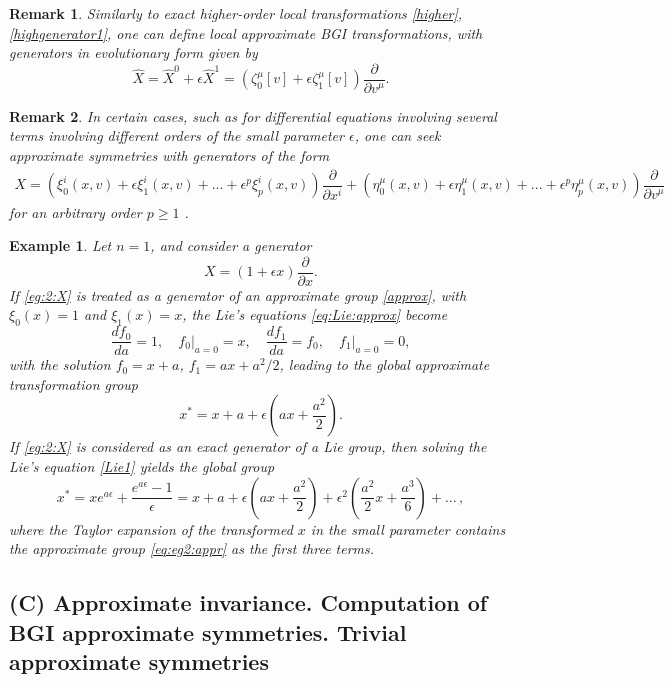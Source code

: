 \documentclass[11pt,letter,subeqn]{article}
\def\beq{\begin{equation}}
\def\eeq{\end{equation}}
\def\barr{\begin{array}{ll}}
\def\earr{\end{array}}
\newtheorem{example}{Example}[section]
\newtheorem{remark}{Remark}[section]
\begin{document}
\begin{remark}
Similarly to exact higher-order local transformations \eqref{higher}, \eqref{highgenerator1}, one can define local approximate BGI transformations, with generators in evolutionary form given by
\beq\label{X:X0:X1:higher}
\hat{X} = \hat{X}^0+\epsilon \hat{X}^1 = \left(\zeta_0^\mu[v]+\epsilon \zeta_1^\mu[v]\right)\dfrac{\partial}{\partial v^\mu}.
\eeq
\end{remark}

\begin{remark}
In certain cases, such as for differential equations involving several terms involving different orders of the small parameter $\epsilon$, one can seek approximate symmetries with generators of the form
\[
\barr
  X = \left(\xi_0^i(x,v)+\epsilon \xi_1^i(x,v)+...+\epsilon^p \xi_p^i(x,v) \right)\dfrac{\partial}{\partial x^i}  +\left(\eta_0^\mu(x,v)+\epsilon \eta_1^\mu(x,v)+...+ \epsilon^p \eta_p^\mu(x,v)\right)\dfrac{\partial}{\partial v^\mu}
\earr
\]
for an arbitrary order $p \geq 1$ \cite{ibragimov1995crc}.
\end{remark}
\begin{example}
Let $n=1$, and consider a generator
\beq\label{eg:2:X}
  X=(1+\epsilon x)\dfrac{\partial}{\partial x}.
\eeq
If \eqref{eg:2:X} is treated as a generator of an approximate group \eqref{approx}, with $\xi_0(x)=1$ and $\xi_1(x)=x$, the Lie's equations \eqref{eq:Lie:approx} become
\[
\dfrac{df_0}{da}=1, \quad f_0\big|_{a=0}=x, \quad \dfrac{df_1}{da}=f_0, \quad f_1\big|_{a=0}=0,
\]
with the solution $f_0=x+a$, $f_1=ax+{a^2}/{2}$, leading to the global approximate transformation group
\beq\label{eq:eg2:appr}
  {x^*}= x+a+\epsilon \left(ax+\dfrac{a^2}{2}\right).
\eeq
If \eqref{eg:2:X} is considered as an exact generator of a Lie group, then solving the Lie's equation \eqref{Lie1} yields the global group
\beq\label{eq:eg2:exact}
   {x^*}=xe^{a\epsilon}+\dfrac{e^{a\epsilon}-1}{\epsilon}=x+a+\epsilon \left(ax+\dfrac{a^2}{2}\right)+\epsilon^2\left(\dfrac{a^2}{2}x+\dfrac{a^3}{6}\right)+\ldots\,,
\eeq
where the Taylor expansion of the transformed $x$ in the small parameter contains the approximate group \eqref{eq:eg2:appr} as the first three terms.
\end{example}


\subsection*{\textbf{(C)} Approximate invariance. Computation of BGI approximate symmetries. Trivial approximate symmetries}
\end{document}
